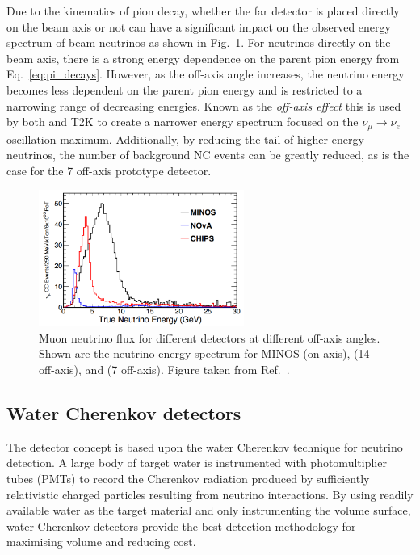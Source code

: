 Due to the kinematics of pion decay, whether the far detector is placed directly on the beam axis
or not can have a significant impact on the observed energy spectrum of beam neutrinos as shown in
Fig.~\ref{fig:numi_axis}. For neutrinos directly on the beam axis, there is a strong energy
dependence on the parent pion energy from Eq.~\ref{eq:pi_decays}. However, as the off-axis angle
increases, the neutrino energy becomes less dependent on the parent pion energy and is restricted
to a narrowing range of decreasing energies. Known as the \emph{off-axis effect} this is used by
both \nova and T2K to create a narrower energy spectrum focused on the
$\nu_{\mu}\rightarrow\nu_{e}$ oscillation maximum. Additionally, by reducing the tail of
higher-energy neutrinos, the number of background NC events can be greatly reduced, as is the case
for the \unit{7}{} off-axis \chipsfive prototype detector.

\begin{figure} %
    \includegraphics[width=0.6\textwidth]{diagrams/4-chips/numi_axis.png}
    \caption[Muon neutrino flux for different \numi detectors at different off-axis angles]
    {Muon neutrino flux for different \numi detectors at different off-axis angles. Shown are the
        neutrino energy spectrum for MINOS (on-axis), \nova (\unit{14}{} off-axis),
        and \chipsfive (\unit{7}{} off-axis). Figure taken from
        Ref.~\cite{adamson2013}.}
    \label{fig:numi_axis}
\end{figure}

\subsection{Water Cherenkov detectors} %
\label{sec:chips_concept_cherenkov} %

The \chips detector concept is based upon the water Cherenkov technique for neutrino detection. A
large body of target water is instrumented with photomultiplier tubes (PMTs) to record the
Cherenkov radiation produced by sufficiently relativistic charged particles resulting from
neutrino interactions. By using readily available water as the target material and only
instrumenting the volume surface, water Cherenkov detectors provide the best detection methodology
for maximising volume and reducing cost.

